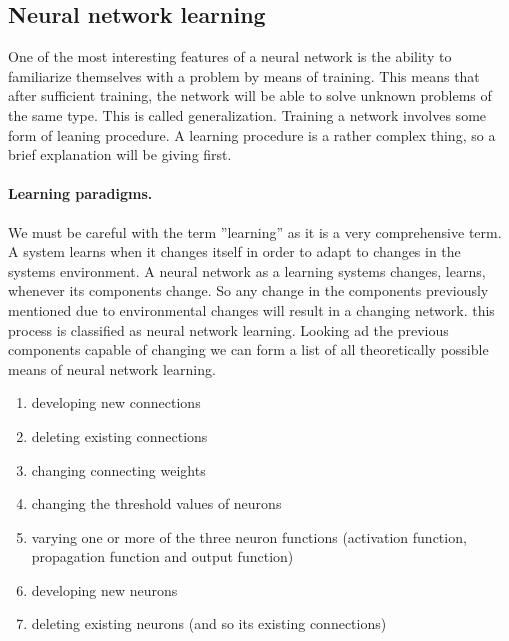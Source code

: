 \documentclass[pdftex,a4paper,12pt,twoside]{report}
\theoremstyle{plain} \newtheorem{theorem}{Theorem} \newtheorem{proposition}{Proposition} \newtheorem{lemma}{Lemma} \newtheorem*{corollary}{Corollary}
\theoremstyle{definition} \newtheorem{definition}{Definition} \newtheorem{conjecture}{Conjecture} \newtheorem*{example}{Example} \newtheorem{algorithm}{Algorithm}
\theoremstyle{remark} \newtheorem*{remark}{Remark} \newtheorem*{note}{Note} \newtheorem{case}{Case}
\begin{document}
\subsection{Neural network learning}
One of the most interesting features of a neural network is the ability to familiarize themselves with a problem by means of training. This means that after sufficient training, the network will be able to solve unknown problems of the same type. This is called generalization. Training a  network involves some form of leaning procedure. A learning procedure is a rather complex thing, so a brief explanation will be giving first.
\paragraph{Learning paradigms.}
We must be careful with the term ''learning'' as it is a very comprehensive term. A system learns when it changes itself in order to adapt to changes in the systems environment. A neural network as a learning systems changes, learns, whenever its components change. So any change in the components previously  mentioned due to environmental changes will result in a changing network. this process is classified as neural network learning. Looking ad the previous components capable of changing we can form a list of all theoretically possible means of neural network learning.
\begin{enumerate}
\item developing new connections
\item deleting existing connections
\item changing connecting weights
\item changing the threshold values of neurons
\item varying one or more of the three neuron functions (activation function, propagation function and output function)
\item developing new neurons
\item deleting existing neurons (and so its existing connections)
\end{enumerate}
\end{document}
